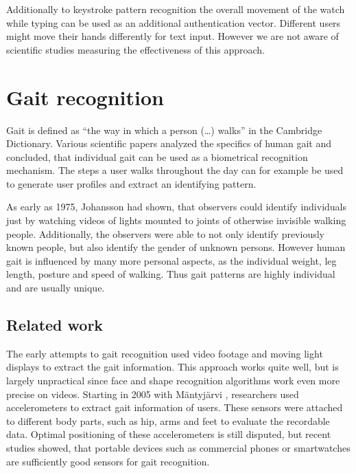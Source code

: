 Additionally to keystroke pattern recognition the overall movement of the watch while typing can be used as an additional authentication vector. Different users might move their hands differently for text input. However we are not aware of scientific studies measuring the effectiveness of this approach.

\section{Gait recognition}
Gait is defined as ``the way in which a person (\ldots) walks'' in the Cambridge Dictionary. Various scientific papers analyzed the specifics of human gait\cite{johansson1975visual, lee2002gait, johnstonsmartwatch} and concluded, that individual gait can be used as a biometrical recognition mechanism. The steps a user walks throughout the day can for example be used to generate user profiles and extract an identifying pattern. 

As early as 1975, Johansson\cite{johansson1975visual} had shown, that observers could identify individuals just by watching videos of lights mounted to joints of otherwise invisible walking people. Additionally, the observers were able to not only identify previously known people, but also identify the gender of unknown persons. However human gait is influenced by many more personal aspects, as the individual weight, leg length, posture and speed of walking. Thus gait patterns are highly individual and are usually unique.
\subsection{Related work}
The early attempts to gait recognition used video footage and moving light displays to extract the gait information. This approach works quite well, but is largely unpractical since face and shape recognition algorithms work even more precise on videos. Starting in 2005 with Mäntyjärvi \etal\cite{mantyjarvi2005identifying}, researchers used accelerometers to extract gait information of users. These sensors were attached to different body parts, such as hip, arms and feet to evaluate the recordable data. Optimal positioning of these accelerometers is still disputed, but recent studies showed, that portable devices such as commercial phones\cite{derawi2013gait} or smartwatches\cite{johnstonsmartwatch} are sufficiently good sensors for gait recognition.


